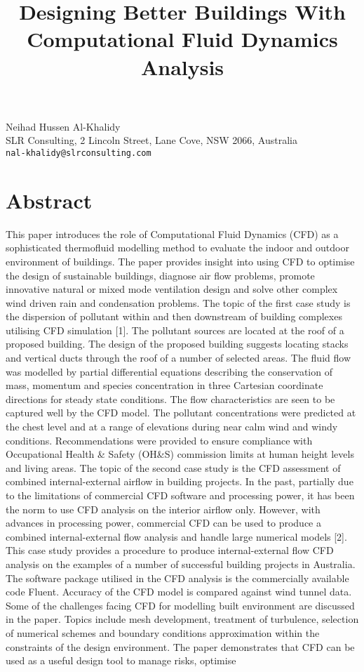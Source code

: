 \documentclass[article,A4,11pt]{llncs}%
\begin{document}
\title{Designing Better Buildings With Computational Fluid Dynamics Analysis}
 \author{} \institute{}
\maketitle
\begin{center}
{\large Neihad Hussen Al-Khalidy}\\
SLR Consulting, 2 Lincoln Street, Lane Cove, NSW 2066, Australia\\
{\tt nal-khalidy@slrconsulting.com}
\end{center}

\section*{Abstract}
This paper introduces the role of Computational Fluid Dynamics (CFD) as a sophisticated thermofluid modelling method to evaluate the indoor and outdoor environment of buildings. The paper provides insight into using CFD to optimise the design of sustainable buildings, diagnose air flow problems, promote innovative natural or mixed mode ventilation design and solve other complex wind driven rain and condensation problems. The topic of the first case study is the dispersion of pollutant within and then downstream of building complexes utilising CFD simulation [1].  The pollutant sources are located at the roof of a proposed building. The design of the proposed building suggests locating stacks and vertical ducts through the roof of a number of selected areas.  The fluid flow was modelled by partial differential equations describing the conservation of mass, momentum and species concentration in three Cartesian coordinate directions for steady state conditions. The flow characteristics are seen to be captured well by the CFD model. The pollutant concentrations were predicted at the chest level and at a range of elevations during near calm wind and windy conditions.  Recommendations were provided to ensure compliance with Occupational Health \& Safety (OH\&S) commission limits at human height levels and living areas. The topic of the second case study is the CFD assessment of combined internal-external airflow in building projects. In the past, partially due to the limitations of commercial CFD software and processing power, it has been the norm to use CFD analysis on the interior airflow only. However, with advances in processing power, commercial CFD can be used to produce a combined internal-external flow analysis and handle large numerical models [2]. This case study provides a procedure to produce internal-external flow CFD analysis on the examples of a number of successful building projects in Australia. The software package utilised in the CFD analysis is the commercially available code Fluent. Accuracy of the CFD model is compared against wind tunnel data. Some of the challenges facing CFD for modelling built environment are discussed in the paper. Topics include mesh development, treatment of turbulence, selection of numerical schemes and boundary conditions approximation within the constraints of the design environment. The paper demonstrates that CFD can be used as a useful design tool to manage risks, optimise 
\end{document}
